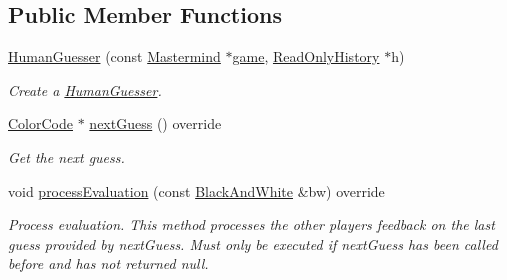 \subsection*{Public Member Functions}
\begin{DoxyCompactItemize}
\item 
\hyperlink{classmastermind_1_1logic_1_1_human_guesser_a8898e930a7d0fd76d796844f600f34de}{Human\+Guesser} (const \hyperlink{classmastermind_1_1logic_1_1_mastermind}{Mastermind} $\ast$\hyperlink{classmastermind_1_1logic_1_1_human_guesser_a36934ed862366c1d0e15e14302a23ff8}{game}, \hyperlink{classmastermind_1_1logic_1_1_read_only_history}{Read\+Only\+History} $\ast$h)
\begin{DoxyCompactList}\small\item\em Create a \hyperlink{classmastermind_1_1logic_1_1_human_guesser}{Human\+Guesser}. \end{DoxyCompactList}\item 
\hyperlink{classmastermind_1_1logic_1_1_color_code}{Color\+Code} $\ast$ \hyperlink{classmastermind_1_1logic_1_1_human_guesser_a5a165250f667fd40099c43cd3caf487c}{next\+Guess} () override
\begin{DoxyCompactList}\small\item\em Get the next guess. \end{DoxyCompactList}\item 
void \hyperlink{classmastermind_1_1logic_1_1_human_guesser_ad1c868e2dac07c1af9bb8935783e2e9b}{process\+Evaluation} (const \hyperlink{classmastermind_1_1logic_1_1_black_and_white}{Black\+And\+White} \&bw) override
\begin{DoxyCompactList}\small\item\em Process evaluation. This method processes the other player\textquotesingle{}s feedback on the last guess provided by {\ttfamily next\+Guess}. Must only be executed if {\ttfamily next\+Guess} has been called before and has not returned {\ttfamily null}. \end{DoxyCompactList}\end{DoxyCompactItemize}
